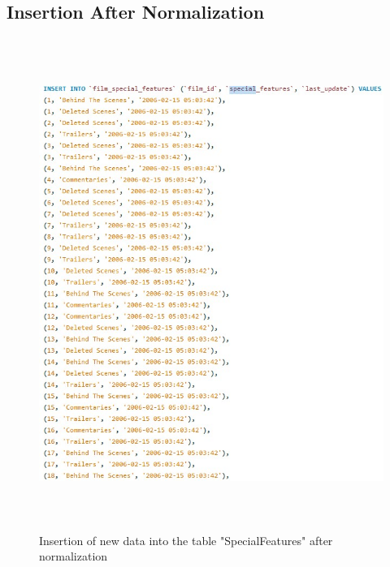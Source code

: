 \documentclass{article}
\begin{document}
	\subsection{Insertion After Normalization}
		\begin{figure}[H]
			\includegraphics[height=16cm]{specialfeatures11_insert}
			\caption{Insertion of new data into the table "Special\textunderscore Features" after normalization}
		\end{figure}
\end{document}
